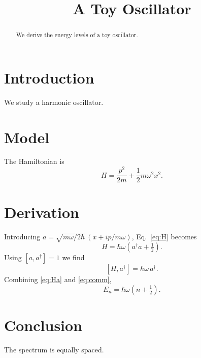 \documentclass{article}
\begin{document}
\title{A Toy Oscillator}
\maketitle
\begin{abstract}
We derive the energy levels of a toy oscillator.
\end{abstract}

\section{Introduction}
We study a harmonic oscillator.

\section{Model}\label{sec:model}
The Hamiltonian is
\begin{equation}\label{eq:H}
H = \frac{p^2}{2m} + \frac{1}{2} m \omega^2 x^2 .
\end{equation}

\section{Derivation}\label{sec:deriv}
Introducing $a = \sqrt{m\omega/2\hbar}\,(x + i p/m\omega)$, Eq.~\eqref{eq:H} becomes
\begin{equation}\label{eq:Ha}
H = \hbar\omega\left(a^\dagger a + \tfrac12\right).
\end{equation}
Using $[a, a^\dagger] = 1$ we find
\begin{equation}\label{eq:comm}
[H, a^\dagger] = \hbar\omega\, a^\dagger .
\end{equation}
Combining \eqref{eq:Ha} and \eqref{eq:comm},
\begin{equation}\label{eq:E}
E_n = \hbar\omega\left(n + \tfrac12\right).
\end{equation}

\section{Conclusion}
The spectrum is equally spaced.
\end{document}
